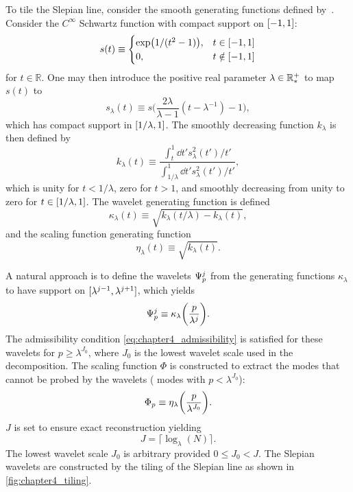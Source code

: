 To tile the Slepian line, consider the smooth generating functions defined by~\autocite{Wiaux2008}.
Consider the \(C^{\infty}\) Schwartz function with compact support on \(\interval{-1}{1}\):
%
\begin{equation}
	s(t) \equiv
	\begin{cases}
		\exp(1/(t^{2}-1)), & t \in \interval{-1}{1}    \\
		0,                 & t \notin \interval{-1}{1}
	\end{cases}
\end{equation}
%
for \(t \in \mathbb{R}\).
One may then introduce the positive real parameter \(\lambda \in \mathbb{R}_{\ast}^{+}{}\) to map \(s(t)\) to
%
\begin{equation}
	s_{\lambda}(t)
	\equiv s\bigg(\frac{2\lambda}{\lambda-1}(t-\lambda^{-1}) - 1\bigg),
\end{equation}
%
which has compact support in \(\interval{1/\lambda}{1}\).
The smoothly decreasing function \(k_{\lambda}\) is then defined by
%
\begin{equation}
	k_{\lambda}(t)
	\equiv \frac{\int_{t}^{1} \dd{t'} s^{2}_{\lambda}(t')/t'}
	{\int_{1/\lambda}^{1} \dd{t'} s^{2}_{\lambda}(t')/t'},
\end{equation}
%
which is unity for \(t < 1/\lambda{}\), zero for \(t > 1\), and smoothly decreasing from unity to zero for \(t \in \interval{1/\lambda}{1}\).
The wavelet generating function is defined
%
\begin{equation}
	\kappa_{\lambda}(t)
	\equiv \sqrt{k_{\lambda}(t/\lambda) - k_{\lambda}(t)},
\end{equation}
%
and the scaling function generating function
%
\begin{equation}
	\eta_{\lambda}(t)
	\equiv \sqrt{k_{\lambda}(t)}.
\end{equation}

A natural approach is to define the wavelets \({\Psi}_{p}^{j}\) from the generating functions \(\kappa_{\lambda}\) to have support on \(\interval{\lambda^{j-1}}{\lambda^{j+1}}\), which yields
%
\begin{equation}
	{\Psi}_{p}^{j}
	\equiv \kappa_{\lambda}\bigg(\frac{p}{\lambda^{j}}\bigg).
\end{equation}
%
The admissibility condition \cref{eq:chapter4_admissibility} is satisfied for these wavelets for \(p \geq \lambda^{J_{0}}\), where \(J_{0}\) is the lowest wavelet scale used in the decomposition.
The scaling function \(\Phi{}\) is constructed to extract the modes that cannot be probed by the wavelets (\ie{} modes with \(p < \lambda^{J_{0}}\)):
%
\begin{equation}
	{\Phi}_{p}
	\equiv \eta_{\lambda}\bigg(\frac{p}{\lambda^{J_{0}}}\bigg).
\end{equation}
%
\(J\) is set to ensure exact reconstruction yielding
%
\begin{equation}
	J = \lceil{} \log_{\lambda}(N)\rceil{}.
\end{equation}
%
The lowest wavelet scale \(J_{0}\) is arbitrary provided \(0 \leq J_{0} < J\).
The Slepian wavelets are constructed by the tiling of the Slepian line as shown in \cref{fig:chapter4_tiling}.

